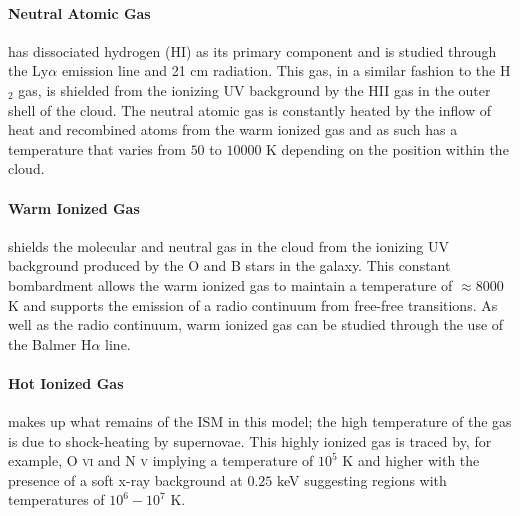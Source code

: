 \paragraph{Neutral Atomic Gas} has dissociated hydrogen (HI) as its primary component and is studied through the Ly$\alpha$ emission line and 21 cm radiation. This gas, in a similar fashion to the H$_2$ gas, is shielded from the ionizing UV background by the HII gas in the outer shell of the cloud. The neutral atomic gas is constantly heated by the inflow of heat and recombined atoms from the warm ionized gas and as such has a temperature that varies from $50$ to $10000$ K depending on the position within the cloud.

\paragraph{Warm Ionized Gas} shields the molecular and neutral gas in the cloud from the ionizing UV background produced by the O and B stars in the galaxy. This constant bombardment allows the warm ionized gas to maintain a temperature of $\approx 8000$ K and supports the emission of a radio continuum from free-free transitions. As well as the radio continuum, warm ionized gas can be studied through the use of the Balmer H$\alpha$ line.

\paragraph{Hot Ionized Gas} makes up what remains of the ISM in this model; the high temperature of the gas is due to shock-heating by supernovae. This highly ionized gas is traced by, for example, O \textsc{vi} and N \textsc{v} implying a temperature of $10^5$ K and higher with the presence of a soft x-ray background at $0.25$ keV suggesting regions with temperatures of $10^6 - 10^7$ K. 

\begin{table}
    \centering
    \caption{Overview of the phases of gas in the ISM. Data adapted from \citet{ferriere_interstellar_2001}.}
    \label{tab:ism}
\end{table}
